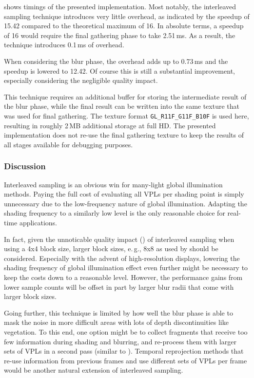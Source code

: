  shows timings of the presented implementation. Most notably, the interleaved sampling technique introduces very little overhead, as indicated by the speedup of 15.42 compared to the theoretical maximum of 16. In absolute terms, a speedup of 16 would require the final gathering phase to take 2.51\,ms. As a result, the technique introduces 0.1\,ms of overhead.

When considering the blur phase, the overhead adds up to 0.73\,ms and the speedup is lowered to 12.42. Of course this is still a substantial improvement, especially considering the negligible quality impact.

This technique requires an additional buffer for storing the intermediate result of the blur phase, while the final result can be written into the same texture that was used for final gathering. The texture format \texttt{GL\_R11F\_G11F\_B10F} is used here, resulting in roughly 2\,MB additional storage at full HD. The presented implementation does not re-use the final gathering texture to keep the results of all stages available for debugging purposes.


\subsubsection{Discussion}
Interleaved sampling is an obvious win for many-light global illumination methods. Paying the full cost of evaluating all VPLs per shading point is simply unnecessary due to the low-frequency nature of global illumination. Adapting the shading frequency to a similarly low level is the only reasonable choice for real-time applications.

In fact, given the unnoticable quality impact () of interleaved sampling when using a 4x4 block size, larger block sizes, e.\,g., 8x8 as used by \citet{hedman2016sequential} should be considered. Especially with the advent of high-resolution displays, lowering the shading frequency of global illumination effect even further might be necessary to keep the costs down to a reasonable level. However, the performance gains from lower sample counts will be offset in part by larger blur radii that come with larger block sizes.

Going further, this technique is limited by how well the blur phase is able to mask the noise in more difficult areas with lots of depth discontinuities like vegetation. To this end, one option might be to collect fragments that receive too few information during shading and blurring, and re-process them with larger sets of VPLs in a second pass (similar to \cite{Lauritzen:2010:Deferred}). Temporal reprojection methods \citep{Jimenez:2016:FilmicSMAA} that re-use information from previous frames and use different sets of VPLs per frame would be another natural extension of interleaved sampling.



